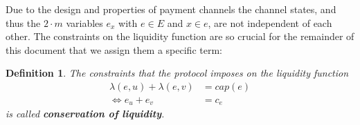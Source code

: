 \documentclass[10pt,twocolumn]{article}
\newtheorem{definition}{Definition}[section]
\begin{document}


Due to the design and properties of payment channels the channel states, and thus the \(2 \cdot m\) variables \(e_x\) with \(e \in E\) and \(x \in e\), are not independent of each other.
The constraints on the liquidity function are so crucial for the remainder of this document that we assign them a specific term: 

\begin{definition}
  The constraints that the protocol imposes on the liquidity function
\begin{equation}
  \label{eq:conservationOfLiquidity}
  \begin{split}
  \lambda(e,u) + \lambda(e,v) & = cap(e) \\
  \Leftrightarrow e_u + e_v & = c_e
  \end{split}
\end{equation}
is called \textbf{conservation of liquidity}.
\end{definition}


\end{document}

